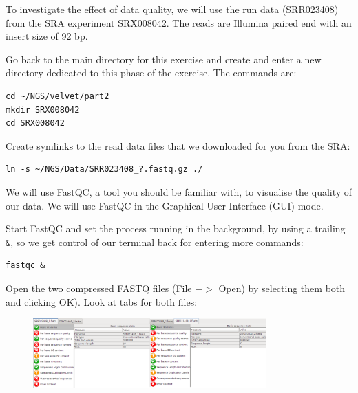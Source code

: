 \begin{information}
To investigate the effect of data quality, we will use the run data (SRR023408)
from the SRA experiment SRX008042. The reads are Illumina paired end with an
insert size of 92 bp.
\end{information}

\begin{steps}
Go back to the main directory for this exercise and create and enter a new
directory dedicated to this phase of the exercise. The commands are:
\begin{lstlisting}
cd ~/NGS/velvet/part2 
mkdir SRX008042 
cd SRX008042
\end{lstlisting}

Create symlinks to the read data files that we downloaded for you from the SRA:
\begin{lstlisting}
ln -s ~/NGS/Data/SRR023408_?.fastq.gz ./
\end{lstlisting}
\end{steps}

\begin{note}
We will use FastQC, a tool you should be familiar with, to visualise the quality
of our data. We will use FastQC in the Graphical User Interface (GUI) mode.
\end{note}

\begin{steps}
Start FastQC and set the process running in the background, by using a trailing
\texttt{\&}, so we get control of our terminal back for entering more commands:
\begin{lstlisting}
fastqc &
\end{lstlisting}
\end{steps}

\begin{steps}
Open the two compressed FASTQ files (File $->$ Open) by selecting them both and clicking OK).
Look at tabs for both files:
\end{steps}

\begin{figure}[H]
\centering
\includegraphics[width=0.8\textwidth]{de_novo/velvet/paired_fastqc.png}
\label{fig:paired_fastqc}
\end{figure}

